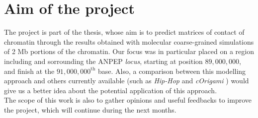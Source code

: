 \section{Aim of the project} \label{chap: aim}

The project is part of the thesis, whose aim is to predict matrices of contact of chromatin through the results obtained with molecular coarse-grained simulations of 2 Mb portions of the chromatin. Our focus was in particular placed on a region including and sorrounding the ANPEP \textit{locus}, starting at position $89,000,000$, and finish at the $91,000,000^{\text{th}}$ base.
Also, a comparison between this modelling approach and others currently available (such as \textit{Hip-Hop} and \textit{cOrigami}
\cite{bucklePolymerSimulationsHeteromorphic2018,tanCelltypespecificPrediction3D2023}) would give us a better idea about the potential application of this approach.\\
The scope of this work is also to gather opinions and useful feedbacks to improve the project, which will continue during the next months.


